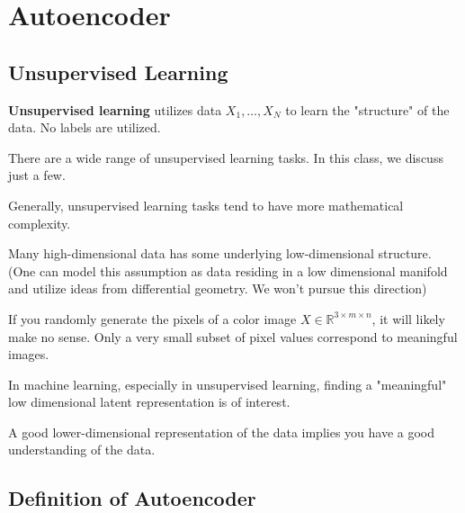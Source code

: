 \documentclass{report}
\begin{document}
\chapter{Autoencoder}

\section{Unsupervised Learning}

\begin{definition}
    \textbf{Unsupervised learning} utilizes data $X_{1}, \ldots, X_{N}$ to learn the "structure" of the data. No labels are utilized.

    There are a wide range of unsupervised learning tasks. In this class, we discuss just a few.

    Generally, unsupervised learning tasks tend to have more mathematical complexity.
\end{definition}

\begin{concept}
    Many high-dimensional data has some underlying low-dimensional structure.
    (One can model this assumption as data residing in a low dimensional manifold and utilize ideas from differential geometry. We won’t pursue this direction)

    If you randomly generate the pixels of a color image $X \in \mathbb{R}^{3 \times m \times n}$, it will likely make no sense. Only a very small subset of pixel values correspond to meaningful images.

    In machine learning, especially in unsupervised learning, finding a "meaningful" low dimensional latent representation is of interest.

    A good lower-dimensional representation of the data implies you have a good understanding of the data.
\end{concept}

\section{Definition of Autoencoder}
\end{document}
